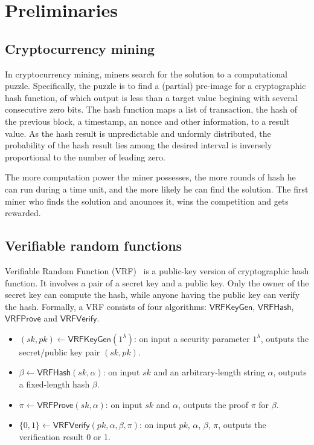 \section{Preliminaries}

\subsection{Cryptocurrency mining}

In cryptocurrency mining, miners search for the solution to a computational puzzle.
Specifically, the puzzle is to find a (partial) pre-image for a cryptographic hash function, of which output is less than a target value begining with several consecutive zero bits.
The hash function maps a list of transaction, the hash of the previous block, a timestamp, an nonce and other information, to a result value.
As the hash result is unpredictable and unformly distributed, the probability of the hash result lies among the desired interval is inversely proportional to the number of leading zero.

The more computation power the miner possesses, the more rounds of hash he can run during a time unit, and the more likely he can find the solution. The first miner who finds the solution and anounces it, wins the competition and gets rewarded.

\subsection{Verifiable random functions}

Verifiable Random Function (VRF)~\cite{micali1999verifiable} is a public-key version of cryptographic hash function.
It involves a pair of a secret key and a public key.
Only the owner of the secret key can compute the hash, while anyone having the public key can verify the hash.
Formally, a VRF consists of four algorithms: $\mathsf{VRFKeyGen}$, $\mathsf{VRFHash}$, $\mathsf{VRFProve}$ and $\mathsf{VRFVerify}$.

\begin{itemize}
    \item $(sk, pk) \gets \mathsf{VRFKeyGen}(1^{\lambda})$: on input a security parameter $1^{\lambda}$, outputs the secret/public key pair $(sk, pk)$.
    \item $\beta \gets \mathsf{VRFHash}(sk, \alpha)$: on input $sk$ and an arbitrary-length string $\alpha$, outputs a fixed-length hash $\beta$.
    \item $\pi \gets \mathsf{VRFProve}(sk, \alpha)$: on input $sk$ and $\alpha$, outputs the proof $\pi$ for $\beta$.
    \item $\{0, 1\} \gets \mathsf{VRFVerify}(pk, \alpha, \beta, \pi)$: on input $pk$, $\alpha$, $\beta$, $\pi$, outputs the verification result 0 or 1.
\end{itemize}

